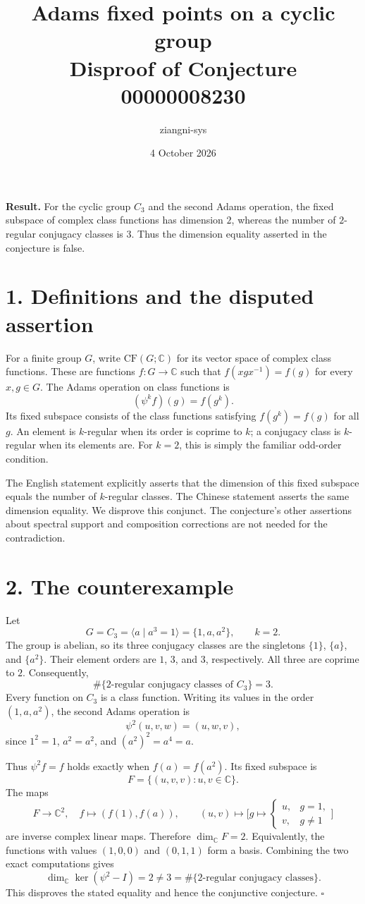\documentclass[11pt,a4paper]{article}
\title{Adams fixed points on a cyclic group\\Disproof of Conjecture 00000008230}
\author{ziangni-sys}
\date{4 October 2026}
\begin{document}
\maketitle

\textbf{Result.} For the cyclic group $C_3$ and the second Adams operation,
the fixed subspace of complex class functions has dimension $2$, whereas
the number of $2$-regular conjugacy classes is $3$. Thus the dimension
equality asserted in the conjecture is false.

\section*{1. Definitions and the disputed assertion}
For a finite group $G$, write $\mathrm{CF}(G;\mathbb C)$ for its vector
space of complex class functions. These are functions $f:G\to\mathbb C$
such that $f(xgx^{-1})=f(g)$ for every $x,g\in G$.
The Adams operation on class functions is
\[
  (\psi^k f)(g)=f(g^k).
\]
Its fixed subspace consists of the class functions satisfying
$f(g^k)=f(g)$ for all $g$. An element is $k$-regular when its order is
coprime to $k$; a conjugacy class is $k$-regular when its elements are.
For $k=2$, this is simply the familiar odd-order condition.

The English statement explicitly asserts that the dimension of this
fixed subspace equals the number of $k$-regular classes. The Chinese
statement asserts the same dimension equality. We disprove this conjunct.
The conjecture's other assertions about spectral support and composition
corrections are not needed for the contradiction.

\section*{2. The counterexample}
Let
\[
  G=C_3=\langle a\mid a^3=1\rangle=\{1,a,a^2\},\qquad k=2.
\]
The group is abelian, so its three conjugacy classes are the singletons
$\{1\}$, $\{a\}$, and $\{a^2\}$. Their element orders are $1$, $3$,
and $3$, respectively. All three are coprime to $2$. Consequently,
\[
  \#\{\text{$2$-regular conjugacy classes of $C_3$}\}=3.
\]
Every function on $C_3$ is a class function. Writing its values in the
order $(1,a,a^2)$, the second Adams operation is
\[
  \psi^2(u,v,w)=(u,w,v),
\]
since $1^2=1$, $a^2=a^2$, and $(a^2)^2=a^4=a$.

\newpage
Thus $\psi^2f=f$ holds exactly when $f(a)=f(a^2)$. Its fixed subspace is
\[
  F=\{(u,v,v):u,v\in\mathbb C\}.
\]
The maps
\[
  F\longrightarrow\mathbb C^2,\quad f\longmapsto(f(1),f(a)),
  \qquad
  (u,v)\longmapsto\bigl[g\mapsto
    \begin{cases}u,&g=1,\\v,&g\ne1\end{cases}\bigr]
\]
are inverse complex linear maps. Therefore $\dim_{\mathbb C}F=2$.
Equivalently, the functions with values $(1,0,0)$ and $(0,1,1)$ form a
basis. Combining the two exact computations gives
\[
  \boxed{\dim_{\mathbb C}\ker(\psi^2-I)=2\ne3
    =\#\{\text{$2$-regular conjugacy classes}\}.}
\]
This disproves the stated equality and hence the conjunctive conjecture.
\hfill$\square$
\end{document}
